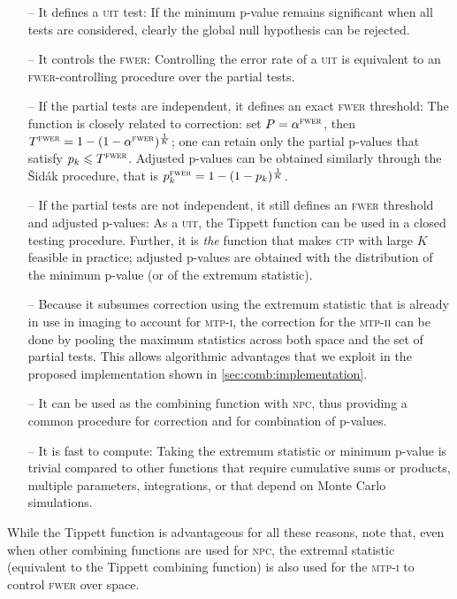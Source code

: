 \begin{itemize}
\item[--] It defines a \textsc{uit} test: If the minimum p-value remains significant when all tests are considered, clearly the global null hypothesis can be rejected.
\item[--] It controls the \textsc{fwer}: Controlling the error rate of a \textsc{uit} is equivalent to an \textsc{fwer}-controlling procedure over the partial tests.
\item[--] If the partial tests are independent, it defines an exact \textsc{fwer} threshold: The function is closely related to \citet{Sidak1967} correction: set $P=\alpha^{\text{\textsc{fwer}}}$, then $T^{\text{\textsc{fwer}}}=1-(1-\alpha^{\text{\textsc{fwer}}})^{\frac{1}{K}}$; one can retain only the partial p-values that satisfy $p_k \leqslant T^{\text{\textsc{fwer}}}$. Adjusted p-values can be obtained similarly through the \v{S}id\'{a}k procedure, that is $p_k^\textsc{fwer}=1-(1-p_k)^{\frac{1}{K}}$.
\item[--] If the partial tests are not independent, it still defines an \textsc{fwer} threshold and adjusted p-values: As a \textsc{uit}, the Tippett function can be used in a closed testing procedure. Further, it is \emph{the} function that makes \textsc{ctp} with large $K$ feasible in practice; adjusted p-values are obtained with the distribution of the minimum p-value (or of the extremum statistic).
\item[--] Because it subsumes correction using the extremum statistic that is already in use in imaging to account for \textsc{mtp-i}, the correction for the \textsc{mtp-ii} can be done by pooling the maximum statistics across both space and the set of partial tests. This allows algorithmic advantages that we exploit in the proposed implementation shown in \ref{sec:comb:implementation}.
\item[--] It can be used as the combining function with \textsc{npc}, thus providing a common procedure for correction and for combination of p-values.
\item[--] It is fast to compute: Taking the extremum statistic or minimum p-value is trivial compared to other functions that require cumulative sums or products, multiple parameters, integrations, or that depend on Monte Carlo simulations.
\end{itemize}

While the Tippett function is advantageous for all these reasons, note that, even when other combining functions are used for \textsc{npc}, the extremal statistic (equivalent to the Tippett combining function) is also used for the \textsc{mtp-i} to control \textsc{fwer} over space.

